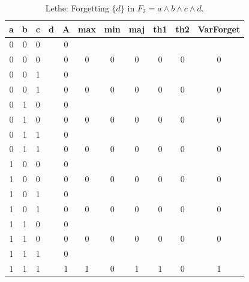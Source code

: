 \begin{table}[!tb]
    \centering
    \begin{tabular}{|c|c|c|c|c|c|c|c|c|c|c|}
        \hline
        \textbf{a} & \textbf{b} & \textbf{c} & \textbf{d} & \textbf{A} & \textbf{max} & \textbf{min} & \textbf{maj} & \textbf{th1} & \textbf{th2} & \textbf{VarForget} \\ \hline
        \rowcolor{gray!40} 0 & 0 & 0 &  & 0 &  &  &  &  &  &  \\ \hline
        \rowcolor{gray!40} 0 & 0 & 0 &  & 0 & 0 & 0 & 0 & 0 & 0 & 0 \\ \hline
        \rowcolor{blue!40} 0 & 0 & 1 &  & 0 &  &  &  &  &  &  \\ \hline
        \rowcolor{blue!40} 0 & 0 & 1 &  & 0 & 0 & 0 & 0 & 0 & 0 & 0 \\ \hline
        \rowcolor{red!40} 0 & 1 & 0 &  & 0 &  &  &  &  &  &  \\ \hline
        \rowcolor{red!40} 0 & 1 & 0 &  & 0 & 0 & 0 & 0 & 0 & 0 & 0 \\ \hline
        \rowcolor{green!40} 0 & 1 & 1 &  & 0 &  &  &  &  &  &  \\ \hline
        \rowcolor{green!40} 0 & 1 & 1 &  & 0 & 0 & 0 & 0 & 0 & 0 & 0 \\ \hline
        \rowcolor{yellow!40} 1 & 0 & 0 &  & 0 &  &  &  &  &  &  \\ \hline
        \rowcolor{yellow!40} 1 & 0 & 0 &  & 0 & 0 & 0 & 0 & 0 & 0 & 0 \\ \hline
        \rowcolor{gray!40} 1 & 0 & 1 &  & 0 &  &  &  &  &  &  \\ \hline
        \rowcolor{gray!40} 1 & 0 & 1 &  & 0 & 0 & 0 & 0 & 0 & 0 & 0 \\ \hline
        \rowcolor{blue!40} 1 & 1 & 0 &  & 0 &  &  &  &  &  &  \\ \hline
        \rowcolor{blue!40} 1 & 1 & 0 &  & 0 & 0 & 0 & 0 & 0 & 0 & 0 \\ \hline
        \rowcolor{red!40} 1 & 1 & 1 &  & 0 &  &  &  &  &  &  \\ \hline
        \rowcolor{red!40} 1 & 1 & 1 &  & 1 & 1 & 0 & 1 & 1 & 0 & 1 \\ \hline
    \end{tabular}
    \caption{Lethe: Forgetting $\{d\}$ in $F_{2} = a \land b \land c \land d$.}
    \label{tab:lethe-F2-d}
\end{table}

